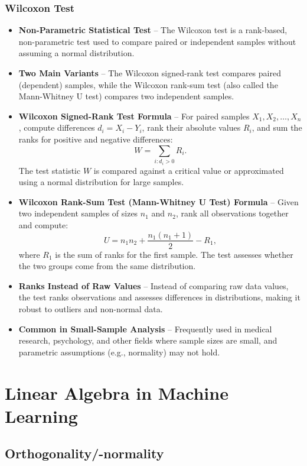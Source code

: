 \documentclass[12pt,a4paper]{article}
\begin{document}
\subsubsection{Wilcoxon Test }
\begin{itemize}
    \item \textbf{Non-Parametric Statistical Test} – The Wilcoxon test is a rank-based, non-parametric test used to compare paired or independent samples without assuming a normal distribution.
    
    \item \textbf{Two Main Variants} – The Wilcoxon signed-rank test compares paired (dependent) samples, while the Wilcoxon rank-sum test (also called the Mann-Whitney U test) compares two independent samples.
    \item \textbf{Wilcoxon Signed-Rank Test Formula} – For paired samples \( X_1, X_2, \dots, X_n \), compute differences \( d_i = X_i - Y_i \), rank their absolute values \( R_i \), and sum the ranks for positive and negative differences:
    \[
    W = \sum_{i: d_i > 0} R_i.
    \]
    The test statistic \( W \) is compared against a critical value or approximated using a normal distribution for large samples.

    \item \textbf{Wilcoxon Rank-Sum Test (Mann-Whitney U Test) Formula} – Given two independent samples of sizes \( n_1 \) and \( n_2 \), rank all observations together and compute:
    \[
    U = n_1 n_2 + \frac{n_1 (n_1 + 1)}{2} - R_1,
    \]
    where \( R_1 \) is the sum of ranks for the first sample. The test assesses whether the two groups come from the same distribution.

    
    \item \textbf{Ranks Instead of Raw Values} – Instead of comparing raw data values, the test ranks observations and assesses differences in distributions, making it robust to outliers and non-normal data.
    
    \item \textbf{Common in Small-Sample Analysis} – Frequently used in medical research, psychology, and other fields where sample sizes are small, and parametric assumptions (e.g., normality) may not hold.
\end{itemize}
\pagebreak
\section{Linear Algebra in Machine Learning}
\subsection{Orthogonality/-normality}
\end{document}
